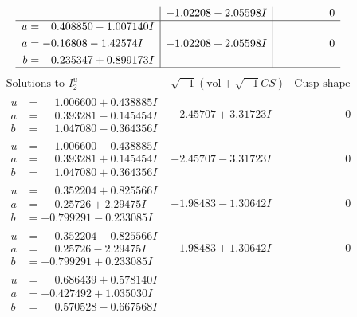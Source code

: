 \documentclass[1p]{elsarticle_modified}
\theoremstyle{definition}
\newcommand{\I}{\sqrt{-1}}
\begin{document}
$$\begin{array}{c|c|c}
 & -1.02208 - 2.05598 I & \phantom{-0.000000 } 0 \\ \hline\begin{aligned}
u &= \phantom{-}0.408850 - 1.007140 I \\
a &= -0.16808 - 1.42574 I \\
b &= \phantom{-}0.235347 + 0.899173 I\end{aligned}
 & -1.02208 + 2.05598 I & \phantom{-0.000000 } 0\\
 \hline 
 \end{array}$$\newpage$$\begin{array}{c|c|c}  
\text{Solutions to }I^u_{2}& \I (\text{vol} + \sqrt{-1}CS) & \text{Cusp shape}\\
 \hline 
\begin{aligned}
u &= \phantom{-}1.006600 + 0.438885 I \\
a &= \phantom{-}0.393281 - 0.145454 I \\
b &= \phantom{-}1.047080 - 0.364356 I\end{aligned}
 & -2.45707 + 3.31723 I & \phantom{-0.000000 } 0 \\ \hline\begin{aligned}
u &= \phantom{-}1.006600 - 0.438885 I \\
a &= \phantom{-}0.393281 + 0.145454 I \\
b &= \phantom{-}1.047080 + 0.364356 I\end{aligned}
 & -2.45707 - 3.31723 I & \phantom{-0.000000 } 0 \\ \hline\begin{aligned}
u &= \phantom{-}0.352204 + 0.825566 I \\
a &= \phantom{-}0.25726 + 2.29475 I \\
b &= -0.799291 - 0.233085 I\end{aligned}
 & -1.98483 - 1.30642 I & \phantom{-0.000000 } 0 \\ \hline\begin{aligned}
u &= \phantom{-}0.352204 - 0.825566 I \\
a &= \phantom{-}0.25726 - 2.29475 I \\
b &= -0.799291 + 0.233085 I\end{aligned}
 & -1.98483 + 1.30642 I & \phantom{-0.000000 } 0 \\ \hline\begin{aligned}
u &= \phantom{-}0.686439 + 0.578140 I \\
a &= -0.427492 + 1.035030 I \\
b &= \phantom{-}0.570528 - 0.667568 I\end{aligned}

\end{array}$$
\end{document}
